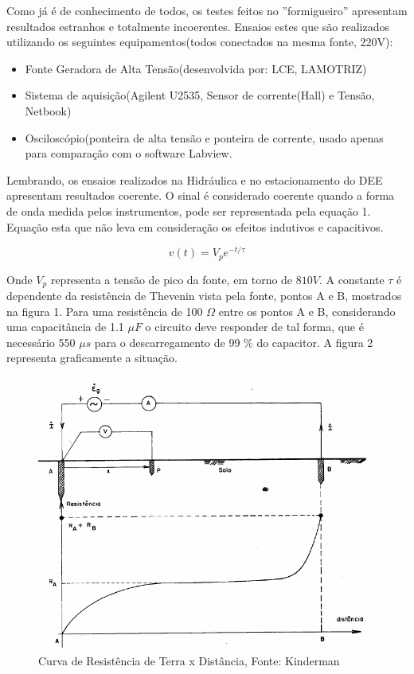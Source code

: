 \documentclass[paper=a4, fontsize=11pt]{article}
\begin{document}
Como já é de conhecimento de todos, os testes feitos no ''formigueiro'' apresentam
resultados estranhos e totalmente incoerentes. Ensaios estes que 
são realizados utilizando os seguintes equipamentos(todos conectados na mesma fonte, 220V):
\begin{itemize}
    \item Fonte Geradora de Alta Tensão(desenvolvida por: LCE, LAMOTRIZ)
\item Sistema de aquisição(Agilent U2535, Sensor de corrente(Hall) e Tensão, Netbook)
\item Osciloscópio(ponteira de alta tensão e ponteira de corrente, usado apenas 
para comparação com o software Labview.
\end{itemize}

Lembrando, os ensaios realizados na Hidráulica e no estacionamento do DEE 
apresentam resultados coerente. O sinal é considerado coerente quando a forma de onda
medida pelos instrumentos, pode ser representada pela equação 1. Equação esta que 
não leva em consideração os efeitos indutivos e capacitivos. 

\begin{equation}
v(t) = V_p e^{-t/\tau}
\end{equation}

Onde $V_p$ representa a tensão de pico da fonte, em torno de $810 V$. A constante
$\tau$ é dependente da resistência de Thevenin vista pela fonte, pontos A e B, mostrados
na figura 1. Para uma resistência de 100 $\Omega$ entre os pontos A e B, considerando
uma capacitância de 1.1 $\mu F$
o circuito  deve responder de tal forma, que é necessário 550 $\mu s$ para o 
descarregamento de  99 $\%$ do capacitor. A figura 2 representa graficamente a situação.

\begin{figure}[!ht]
    \centering
    \includegraphics[scale=.6]{medicao.png}
    \caption{Curva de Resistência de Terra x Distância, Fonte: Kinderman}
\end{figure}
\end{document}
